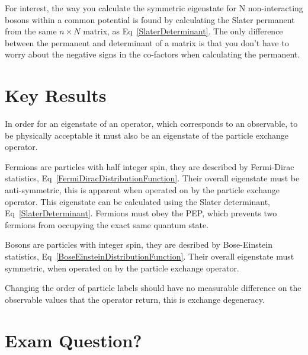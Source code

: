 \noindent For interest, the way you calculate the symmetric eigenstate for N non-interacting bosons within a common potential is found by calculating the Slater permanent from the same $n \times N$ matrix, as Eq~\ref{SlaterDeterminant}. The only difference between the permanent and determinant of a matrix is that you don't have to worry about the negative signs in the co-factors when calculating the permanent.

\section{Key Results}

In order for an eigenstate of an operator, which corresponds to an observable, to be physically acceptable it must also be an eigenstate of the particle exchange operator.

\noindent Fermions are particles with half integer spin, they are described by Fermi-Dirac statistics, Eq~\ref{FermiDiracDistributionFunction}. Their overall eigenstate must be anti-symmetric, this is apparent when operated on by the particle exchange operator. This eigenstate can be calculated using the Slater determinant, Eq~\ref{SlaterDeterminant}. Fermions must obey the PEP, which prevents two fermions from occupying the exact same quantum state.

\noindent Bosons are particles with integer spin, they are desribed by Bose-Einstein statistics, Eq~\ref{BoseEinsteinDistributionFunction}. Their overall eigenstate must symmetric, when operated on by the particle exchange operator.

\noindent Changing the order of particle labels should have no measurable difference on the observable values that the operator return, this is exchange degeneracy.

\section{Exam Question?}


